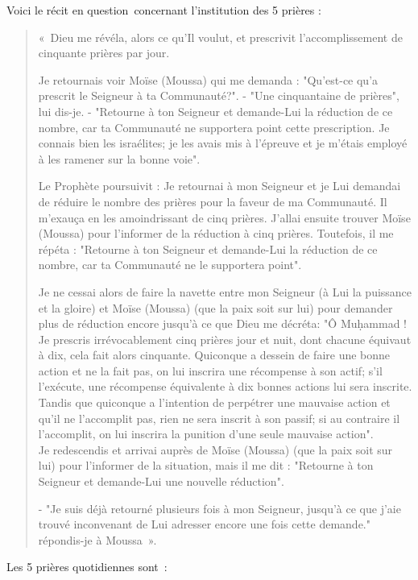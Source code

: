 Voici le récit en question~concernant l'institution des 5 prières :

\begin{quote}
«~Dieu me révéla, alors ce qu'Il voulut, et prescrivit l'accomplissement
de cinquante prières par jour.

Je retournais voir Moïse (Moussa) qui me demanda : "Qu'est-ce qu'a
prescrit le Seigneur à ta Communauté?". - "Une cinquantaine de prières",
lui dis-je. - "Retourne à ton Seigneur et demande-Lui la réduction de ce
nombre, car ta Communauté ne supportera point cette prescription. Je
connais bien les israélites; je les avais mis à l'épreuve et je m'étais
employé à les ramener sur la bonne voie".

Le Prophète poursuivit : Je retournai à mon Seigneur et je Lui demandai
de réduire le nombre des prières pour la faveur de ma Communauté. Il
m'exauça en les amoindrissant de cinq prières. J'allai ensuite trouver
Moïse (Moussa) pour l'informer de la réduction à cinq prières.
Toutefois, il me répéta : "Retourne à ton Seigneur et demande-Lui la
réduction de ce nombre, car ta Communauté ne le supportera point".

Je ne cessai alors de faire la navette entre mon Seigneur (à Lui la
puissance et la gloire) et Moïse (Moussa) (que la paix soit sur lui)
pour demander plus de réduction encore jusqu'à ce que Dieu me décréta:
"Ô Muḥammad ! Je prescris irrévocablement cinq prières jour et nuit,
dont chacune équivaut à dix, cela fait alors cinquante. Quiconque a
dessein de faire une bonne action et ne la fait pas, on lui inscrira une
récompense à son actif; s'il l'exécute, une récompense équivalente à dix
bonnes actions lui sera inscrite. Tandis que quiconque a l'intention de
perpétrer une mauvaise action et qu'il ne l'accomplit pas, rien ne sera
inscrit à son passif; si au contraire il l'accomplit, on lui inscrira la
punition d'une seule mauvaise action".\\
Je redescendis et arrivai auprès de Moïse (Moussa) (que la paix soit sur
lui) pour l'informer de la situation, mais il me dit : "Retourne à ton
Seigneur et demande-Lui une nouvelle réduction".

- "Je suis déjà retourné plusieurs fois à mon Seigneur, jusqu'à ce que
j'aie trouvé inconvenant de Lui adresser encore une fois cette demande."
répondis-je à Moussa~».
\end{quote}

Les 5 prières quotidiennes sont~:

